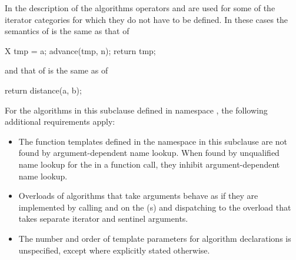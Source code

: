 {\color{newclr}
\pnum
In the description of the algorithms operators
\tcode{+}
and
\tcode{-}
are used for some of the iterator categories for which
they do not have to be defined.
In these cases the semantics of
is the same as that of

\begin{codeblock}
X tmp = a;
advance(tmp, n);
return tmp;
\end{codeblock}

and that of
is the same as of

\begin{codeblock}
return distance(a, b);
\end{codeblock}

\pnum
For the algorithms in this subclause defined in namespace ,
the following additional requirements apply:
\begin{itemize}
\item The function templates defined in the  namespace
  in this subclause are not found by argument-dependent
  name lookup. When found by
  unqualified name lookup for the
   in a function call, they
  inhibit argument-dependent name lookup.
\item Overloads of algorithms that take  arguments
  behave as if they are implemented by calling 
  and  on the (s) and dispatching to the
  overload that takes separate iterator and sentinel arguments.
\item The number and order of template parameters for algorithm declarations
  is unspecified, except where explicitly stated otherwise.
\end{itemize}
} %

